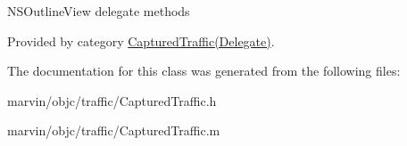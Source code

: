 N\+S\+Outline\+View delegate methods 

Provided by category \hyperlink{category_captured_traffic_07_delegate_08_a819263857354e5b56f58dbe5995aaf8c}{Captured\+Traffic(\+Delegate)}.



The documentation for this class was generated from the following files\+:\begin{DoxyCompactItemize}
\item 
marvin/objc/traffic/Captured\+Traffic.\+h\item 
marvin/objc/traffic/Captured\+Traffic.\+m\end{DoxyCompactItemize}
